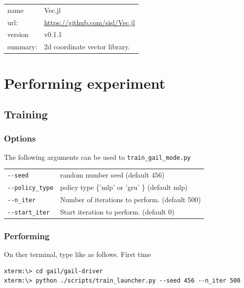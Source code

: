 \documentclass[openany,11pt]{report}%
\begin{document}
\begin{tabular}{|p{2cm}p{12cm}|} \hline
name & Vec.jl \\
url: & \url{https://github.com/sisl/Vec.jl} \\
version & v0.1.1 \\
summary: & 2d coordinate vector library. \\
\hline
\end{tabular}


\chapter{Performing experiment}

\section{Training}

\subsection{Options}

The following arguments can be used to {\tt train\_gail\_mode.py}


\begin{tabular}{|p{4cm}|p{10cm}|} \hline
{\tt -\hspace{0.1mm}-seed} & random number seed (default 456) \\
{\tt -\hspace{0.1mm}-policy\_type} & policy type \{'mlp' or 'gru' \} (default mlp) \\
{\tt -\hspace{0.1mm}-n\_iter} & Number of iterations to perform. (default 500) \\
{\tt -\hspace{0.1mm}-start\_iter} & Start iteration to perform. (default 0) \\
\hline
\end{tabular}

\subsection{Performing}

On ther terminal, type like as follows.
First time 

\begin{lstlisting}[style=DOS]
xterm:\> cd gail/gail-driver
xterm:\> python ./scripts/train_launcher.py --seed 456 --n_iter 500 
\end{lstlisting}
\end{document}
